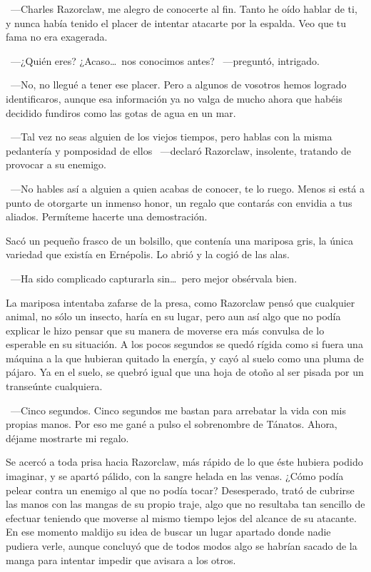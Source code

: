 ~---Charles Razorclaw, me alegro de conocerte al fin. Tanto he oído hablar de ti, y nunca había tenido el placer de intentar atacarte por la espalda. Veo que tu fama no era exagerada.

~---¿Quién eres? ¿Acaso\dots\ nos conocimos antes? ~---preguntó, intrigado.

~---No, no llegué a tener ese placer. Pero a algunos de vosotros hemos logrado identificaros, aunque esa información ya no valga de mucho ahora que habéis decidido fundiros como las gotas de agua en un mar.

~---Tal vez no seas alguien de los viejos tiempos, pero hablas con la misma pedantería y pomposidad de ellos ~---declaró Razorclaw, insolente, tratando de provocar a su enemigo.

~---No hables así a alguien a quien acabas de conocer, te lo ruego. Menos si está a punto de otorgarte un inmenso honor, un regalo que contarás con envidia a tus aliados. Permíteme hacerte una demostración.

Sacó un pequeño frasco de un bolsillo, que contenía una mariposa gris, la única variedad que existía en Ernépolis. Lo abrió y la cogió de las alas.

~---Ha sido complicado capturarla sin\dots\ pero mejor obsérvala bien.

La mariposa intentaba zafarse de la presa, como Razorclaw pensó que cualquier animal, no sólo un insecto, haría en su lugar, pero aun así algo que no podía explicar le hizo pensar que su manera de moverse era más convulsa de lo esperable en su situación. A los pocos segundos se quedó rígida como si fuera una máquina a la que hubieran quitado la energía, y cayó al suelo como una pluma de pájaro. Ya en el suelo, se quebró igual que una hoja de otoño al ser pisada por un transeúnte cualquiera.

~---Cinco segundos. Cinco segundos me bastan para arrebatar la vida con mis propias manos. Por eso me gané a pulso el sobrenombre de Tánatos. Ahora, déjame mostrarte mi regalo.

Se acercó a toda prisa hacia Razorclaw, más rápido de lo que éste hubiera podido imaginar, y se apartó pálido, con la sangre helada en las venas. ¿Cómo podía pelear contra un enemigo al que no podía tocar? Desesperado, trató de cubrirse las manos con las mangas de su propio traje, algo que no resultaba tan sencillo de efectuar teniendo que moverse al mismo tiempo lejos del alcance de su atacante. En ese momento maldijo su idea de buscar un lugar apartado donde nadie pudiera verle, aunque concluyó que de todos modos algo se habrían sacado de la manga para intentar impedir que avisara a los otros.

